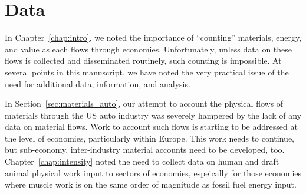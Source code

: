 % 
% 
% 


\section{Data}
\label{sec:Data}

In Chapter~\ref{chap:intro}, 
we noted the importance of ``counting''
materials, energy, and value as each flows through economies.  
Unfortunately, unless data on these flows 
is collected and disseminated routinely, 
such counting is impossible.
At several points in this manuscript,
we have noted the very practical issue of the
need for additional data, information, and analysis.

In Section~\ref{sec:materials_auto},
our attempt to account the physical flows of 
materials through the US auto industry was
severely hampered by the lack of any data on
material flows.
Work to account such flows is starting to be
addressed at the level of economies,
particularly within Europe.\cite{EUROSTAT2011}
This work needs to continue, but
sub-economy, inter-industry material accounts need to be developed, too.
Chapter~\ref{chap:intensity} noted the need to collect
data on human and draft animal physical work input to 
sectors of economies, espeically for those economies where 
muscle work is on the same order of magnitude 
as fossil fuel energy input.

